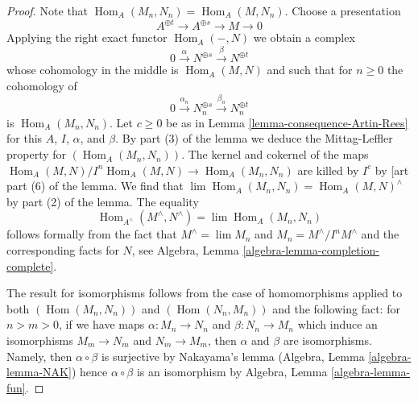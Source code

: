 \documentclass[10pt,a4paper]{amsart}
\theoremstyle{plain}
\theoremstyle{definition}
\theoremstyle{remark}
\numberwithin{equation}{subsection}
\def\lim{\mathop{\mathrm{lim}}\nolimits}
\def\Hom{\mathop{\mathrm{Hom}}\nolimits}
\begin{document}
\begin{proof}
Note that $\Hom_A(M_n, N_n) = \Hom_A(M, N_n)$. Choose a presentation
$$
A^{\oplus t} \to A^{\oplus s} \to M \to 0
$$
Applying the right exact functor $\Hom_A(-, N)$ we obtain a complex
$$
0 \xrightarrow{\alpha} N^{\oplus s} \xrightarrow{\beta} N^{\oplus t}
$$
whose cohomology in the middle is $\Hom_A(M, N)$ and such that for
$n \geq 0$ the cohomology of
$$
0 \xrightarrow{\alpha_n} N_n^{\oplus s} \xrightarrow{\beta_n} N_n^{\oplus t}
$$
is $\Hom_A(M_n, N_n)$. Let $c \geq 0$ be as in
Lemma \ref{lemma-consequence-Artin-Rees}
for this $A$, $I$, $\alpha$, and $\beta$.
By part (3) of the lemma
we deduce the Mittag-Leffler property for $(\Hom_A(M_n, N_n))$.
The kernel and cokernel of the maps
$\Hom_A(M, N)/I^n\Hom_A(M, N) \to \Hom_A(M_n, N_n)$
are killed by $I^c$ by [art part (6) of the lemma.
We find that $\lim \Hom_A(M_n, N_n) = \Hom_A(M, N)^\wedge$ by
part (2) of the lemma. The equality
$$
\Hom_{A^\wedge}(M^\wedge, N^\wedge) = \lim \Hom_A(M_n, N_n)
$$
follows formally from the fact that $M^\wedge = \lim M_n$ and
$M_n = M^\wedge/I^nM^\wedge$ and the corresponding facts for $N$, see
Algebra, Lemma \ref{algebra-lemma-completion-complete}.

\medskip\noindent
The result for isomorphisms follows from the case of homomorphisms
applied to both $(\Hom(M_n, N_n))$ and $(\Hom(N_n, M_n))$
and the following fact: for $n > m > 0$, if we have maps
$\alpha : M_n \to N_n$ and $\beta : N_n \to M_n$ which
induce an isomorphisms $M_m \to N_m$ and $N_m \to M_m$, then
$\alpha$ and $\beta$ are isomorphisms. Namely, then $\alpha \circ \beta$
is surjective by Nakayama's lemma (Algebra, Lemma \ref{algebra-lemma-NAK})
hence $\alpha \circ \beta$ is an isomorphism by
Algebra, Lemma \ref{algebra-lemma-fun}.
\end{proof}
\end{document}
